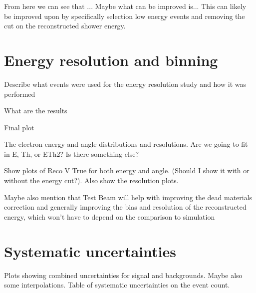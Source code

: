 \begin{figure}
\begin{scriptsize}
\label{tab:CutflowTableBackground}
\end{scriptsize}
\end{figure}

From here we can see that ... Maybe what can be improved is...
This can likely be improved upon by specifically selection low energy events and removing the cut on the reconstructed shower energy. 


\section{Energy resolution and binning}\label{sec:NuMMResolution}
Describe what events were used for the energy resolution study and how it was performed

What are the results

Final plot

The electron energy and angle distributions and resolutions. Are we going to fit in E, Th, or ETh2? Is there something else?

Show plots of Reco V True for both energy and angle. (Should I show it with or without the energy cut?). Also show the resolution plots.

Maybe also mention that Test Beam will help with improving the dead materials correction and generally improving the bias and resolution of the reconstructed energy, which won't have to depend on the comparison to simulation

\section{Systematic uncertainties}\label{sec:NuMMSystematics}
\iffalse
{}
Plots showing combined uncertainties for signal and backgrounds. Maybe also some interpolations. Table of systematic uncertainties on the event count.

